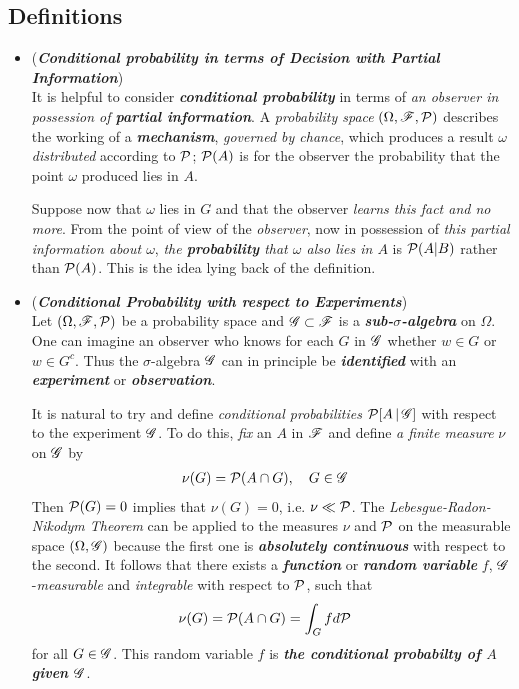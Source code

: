\documentclass[11pt]{article}
\begin{document}
\subsection{Definitions}
\begin{itemize}
\item \begin{remark} (\emph{\textbf{Conditional probability  in terms of Decision with Partial Information}})\\
It is helpful to consider \emph{\textbf{conditional probability}} in terms of \emph{an observer in possession of \textbf{partial information}}. A \emph{probability space} $(\Omega,  {\mathscr F},  {\mathcal P})$ describes the working of a \emph{\textbf{mechanism}}, \emph{governed by chance}, which produces a result $\omega$ \emph{distributed} according to ${\mathcal P}$; ${\mathcal P}(A)$ is for the observer the probability that the point $\omega$ produced lies in $A$. 

Suppose now that $\omega$ lies in $G$ and that the observer \emph{learns this fact and no more}. From the point of view of the \emph{observer}, now in possession of \emph{this partial information about $\omega$}, \emph{the \textbf{probability} that $\omega$ also lies in $A$} is ${\mathcal P}(A | B)$ rather than ${\mathcal P}(A)$. This is the idea lying back of the
definition.
\end{remark}

\item \begin{remark} (\emph{\textbf{Conditional Probability with respect to Experiments}})\\
Let  $(\Omega,  {\mathscr F},  {\mathcal P})$ be a probability space and ${\mathscr G} \subset {\mathscr F}$ is a \emph{\textbf{sub-$\sigma$-algebra}} on $\Omega$. One can imagine an observer who knows for each $G$ in ${\mathscr G}$ whether $w \in G$ or $w \in G^{c}$. Thus the $\sigma$-algebra  ${\mathscr G}$ can in principle be \emph{\textbf{identified}} with an \emph{\textbf{experiment}} or \emph{\textbf{observation}}. 

It is natural to try and define \emph{conditional probabilities} ${\mathcal P}[A \,|\, {\mathscr G}]$ with respect to the experiment ${\mathscr G}$.  To do this, \emph{fix} an $A$ in ${\mathscr F}$ and define \emph{a finite
measure} $\nu$ on ${\mathscr G}$ by
\begin{align*}
\nu(G) &= {\mathcal P}(A \cap G), \quad G \in {\mathscr G}
\end{align*} Then ${\mathcal P}(G) = 0$ implies that $\nu(G) = 0$, i.e. $\nu \ll {\mathcal P}$. The \emph{Lebesgue-Radon-Nikodym Theorem} can be applied to the measures $\nu$ and ${\mathcal P}$ on the measurable space $(\Omega, {\mathscr G})$ because the first one is \emph{\textbf{absolutely continuous}} with respect to the second. It follows
that there exists a \emph{\textbf{function}} or \emph{\textbf{random variable}} $f$, ${\mathscr G}$-\emph{measurable}  and \emph{integrable} with respect to ${\mathcal P}$, such that 
\begin{align*}
\nu(G) &= {\mathcal P}(A \cap G) = \int_{G} f d{\mathcal P}
\end{align*} for all $G \in {\mathscr G}$. This random variable $f$ is \emph{\textbf{the conditional probabilty of $A$ given ${\mathscr G}$}}.
\end{remark}


\end{itemize}
\end{document}
